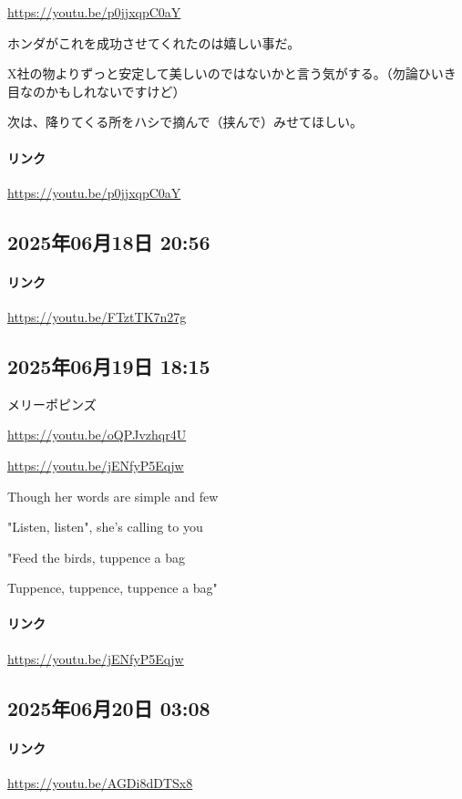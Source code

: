 \url{https://youtu.be/p0jjxqpC0aY}

ホンダがこれを成功させてくれたのは嬉しい事だ。

X社の物よりずっと安定して美しいのではないかと言う気がする。（勿論ひいき目なのかもしれないですけど）

次は、降りてくる所をハシで摘んで（挟んで）みせてほしい。

\paragraph{リンク}
\url{https://youtu.be/p0jjxqpC0aY}

\subsection*{2025年06月18日 20:56}

\paragraph{リンク}
\url{https://youtu.be/FTztTK7n27g}

\subsection*{2025年06月19日 18:15}

メリーポピンズ

\url{https://youtu.be/oQPJvzhqr4U}

\url{https://youtu.be/jENfyP5Eqjw}

Though her words are simple and few

"Listen, listen", she's calling to you

"Feed the birds, tuppence a bag

Tuppence, tuppence, tuppence a bag"

\paragraph{リンク}
\url{https://youtu.be/jENfyP5Eqjw}

\subsection*{2025年06月20日 03:08}

\paragraph{リンク}
\url{https://youtu.be/AGDi8dDTSx8}

